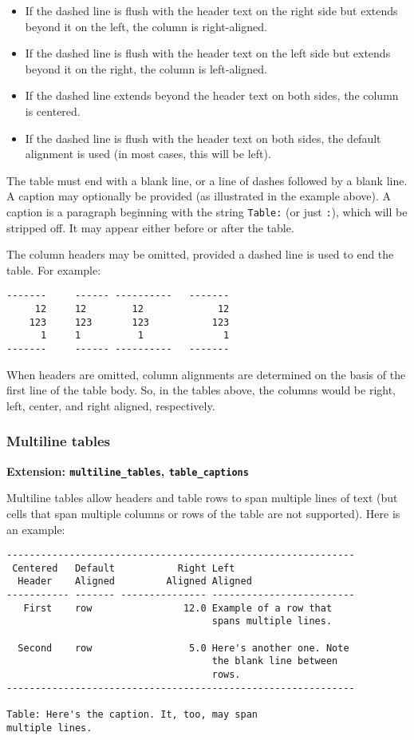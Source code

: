\documentclass[]{article}
\begin{document}
\begin{itemize}
\item
  If the dashed line is flush with the header text on the right side but
  extends beyond it on the left, the column is right-aligned.
\item
  If the dashed line is flush with the header text on the left side but
  extends beyond it on the right, the column is left-aligned.
\item
  If the dashed line extends beyond the header text on both sides, the
  column is centered.
\item
  If the dashed line is flush with the header text on both sides, the
  default alignment is used (in most cases, this will be left).
\end{itemize}

The table must end with a blank line, or a line of dashes followed by a
blank line. A caption may optionally be provided (as illustrated in the
example above). A caption is a paragraph beginning with the string
\texttt{Table:} (or just \texttt{:}), which will be stripped off. It may
appear either before or after the table.

The column headers may be omitted, provided a dashed line is used to end
the table. For example:

\begin{verbatim}
-------     ------ ----------   -------
     12     12        12             12
    123     123       123           123
      1     1          1              1
-------     ------ ----------   -------
\end{verbatim}

When headers are omitted, column alignments are determined on the basis
of the first line of the table body. So, in the tables above, the
columns would be right, left, center, and right aligned, respectively.

\subsubsection{Multiline tables}

\textbf{Extension: \texttt{multiline\_tables}, \texttt{table\_captions}}

Multiline tables allow headers and table rows to span multiple lines of
text (but cells that span multiple columns or rows of the table are not
supported). Here is an example:

\begin{verbatim}
-------------------------------------------------------------
 Centered   Default           Right Left
  Header    Aligned         Aligned Aligned
----------- ------- --------------- -------------------------
   First    row                12.0 Example of a row that
                                    spans multiple lines.

  Second    row                 5.0 Here's another one. Note
                                    the blank line between
                                    rows.
-------------------------------------------------------------

Table: Here's the caption. It, too, may span
multiple lines.
\end{verbatim}
\end{document}
